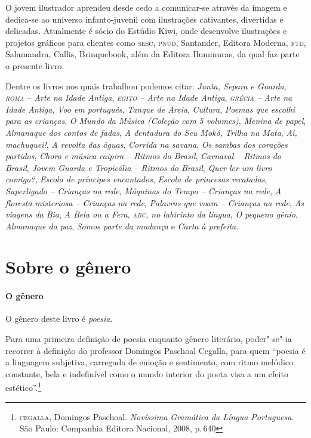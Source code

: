 \documentclass[11pt]{extarticle}
\begin{document}
O jovem ilustrador aprendeu desde cedo a comunicar-se através da imagem e dedica-se ao universo infanto-juvenil 
com ilustrações cativantes, divertidas e delicadas.
Atualmente é sócio do Estúdio Kiwi, onde desenvolve ilustrações e projetos gráficos para 
clientes como \textsc{sesc}, \textsc{pnud}, Santander, Editora Moderna, \textsc{ftd}, 
Salamandra, Callis, Brinquebook, além da Editora Iluminuras,
da qual faz parte o presente livro.

Dentre os livros nos quais trabalhou podemos citar: 
\textit{Junta, Separa e Guarda}, \textit{\textsc{roma} -- Arte na Idade Antiga},
\textit{\textsc{egito} -- Arte na Idade Antiga}, \textit{\textsc{grécia} -- Arte 
na Idade Antiga}, \textit{Voo em português}, \textit{Tanque de Areia}, \textit{Cultura},
\textit{Poemas que escolhi para as crianças}, \textit{O Mundo da Música (Coleção com 5 volumes)},
\textit{Menina de papel}, \textit{Almanaque dos contos de fadas}, \textit{A dentadura do Seu Mokó},
\textit{Trilha na Mata}, \textit{Ai, machuquei!}, \textit{A revolta das águas}, \textit{Corrida na savana},
\textit{Os sambas dos corações partidos}, \textit{Choro e música caipira -- Ritmos do Brasil},
\textit{Carnaval -- Ritmos do Brasil}, \textit{Jovem Guarda e Tropicália -- Ritmos do Brasil},
\textit{Quer ler um livro comigo?}, \textit{Escola de príncipes encantados}, \textit{Escola de princesas recatadas},
\textit{Superligado -- Crianças na rede}, \textit{Máquinas do Tempo -- Crianças na rede},
\textit{A floresta misteriosa -- Crianças na rede}, \textit{Palavras que voam -- Crianças na rede},
\textit{As viagens da Bia}, \textit{A Bela ou a Fera}, \textit{\textsc{abc}, no labirinto da língua},
\textit{O pequeno gênio}, \textit{Almanaque da paz}, \textit{Somos parte da mudança} e
\textit{Carta à prefeita}.


\section{Sobre o gênero}

\paragraph{O gênero} O gênero deste livro é \textit{poesia}. 


Para uma primeira definição de poesia enquanto gênero literário, poder"-se"-ia recorrer à definição do professor Domingos Paschoal Cegalla, para quem ``poesia é a linguagem subjetiva, carregada de emoção e sentimento, com ritmo melódico constante, bela e indefinível como o mundo interior do poeta visa a um efeito estético''.\footnote{\textsc{cegalla}, Domingos Paschoal. \textit{Novíssima Gramática da Língua Portuguesa}. São Paulo: Companhia Editora Nacional, 2008, p.\,640}
\end{document}
